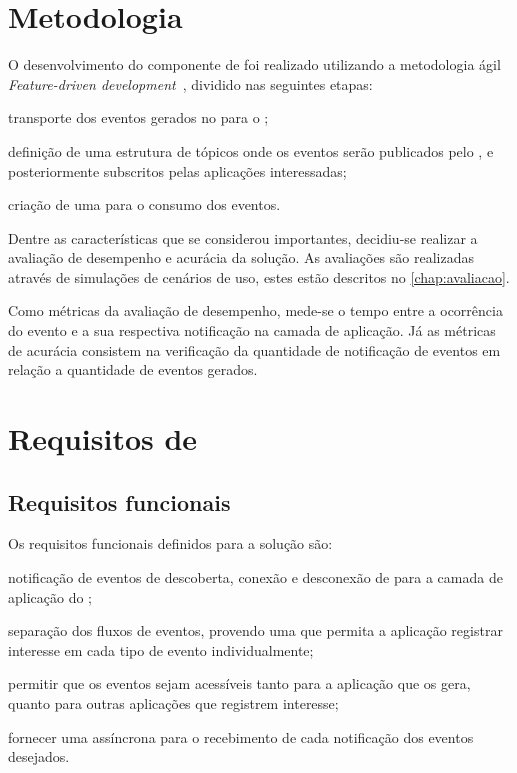 \section{Metodologia} \label{sec:metodologia}

O desenvolvimento do componente de \software foi realizado utilizando a metodologia ágil \textit{Feature-driven development}~\cite{coad:luca:lefebvre:1999}, dividido nas seguintes etapas:

\begin{alineas}
	\item transporte dos eventos gerados no \stwopa para o \cddl;

	\item definição de uma estrutura de tópicos onde os eventos serão publicados pelo \cddl, e posteriormente subscritos pelas aplicações interessadas;

	\item criação de uma \api para o consumo dos eventos.
\end{alineas}

Dentre as características que se considerou importantes, decidiu-se realizar a avaliação de desempenho e acurácia da solução.
As avaliações são realizadas através de simulações de cenários de uso, estes estão descritos no \autoref{chap:avaliacao}.

Como métricas da avaliação de desempenho, mede-se o tempo entre a ocorrência do evento e a sua respectiva notificação na camada de aplicação. Já as métricas de acurácia consistem na verificação da quantidade de notificação de eventos em relação a quantidade de eventos gerados.

\section{Requisitos de \software}

\subsection*{Requisitos funcionais}

Os requisitos funcionais definidos para a solução são:

\begin{alineas}
	\item notificação de eventos de descoberta, conexão e desconexão de \smartobjs para a camada de aplicação do \software;

	\item separação dos fluxos de eventos, provendo uma \api que permita a aplicação registrar interesse em cada tipo de evento individualmente;

	\item permitir que os eventos sejam acessíveis tanto para a aplicação que os gera, quanto para outras aplicações que registrem interesse;

	\item fornecer uma \api assíncrona para o recebimento de cada notificação dos eventos desejados.
\end{alineas}

